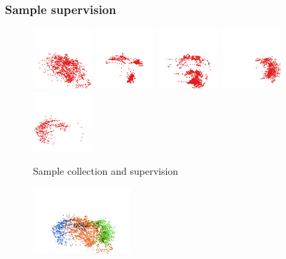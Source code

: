 \documentclass{beamer}
\begin{document}
	\begin{frame}
		\frametitle{Sample supervision}
		\begin{figure}
			\hspace*{-2cm}
			\includegraphics[width=0.2\textwidth]{images/allsamples-empty} \hspace*{0.2cm}
			\includegraphics[width=0.2\textwidth]{images/allsamples-zoom} \hspace*{0.2cm}
			\includegraphics[width=0.2\textwidth]{images/allsamples-point} \hspace*{0.2cm}
			\includegraphics[width=0.2\textwidth]{images/allsamples-right} \hspace*{0.2cm}
			\includegraphics[width=0.2\textwidth]{images/allsamples-left}
			\caption{Sample collection and supervision}
		\end{figure}
		\begin{figure}
			\hspace*{-2cm}
			\includegraphics[width=0.33\textwidth]{images/allsamples-left-nothing-right} \hspace*{0.2cm}

\end{figure}
\end{frame}
\end{document}
